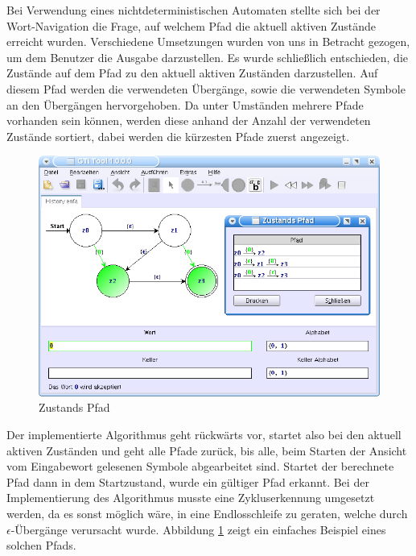 Bei Verwendung eines nichtdeterministischen Automaten stellte sich bei der
Wort-Navigation die Frage, auf welchem Pfad die aktuell aktiven Zustände erreicht
wurden. Verschiedene Umsetzungen wurden von uns in Betracht gezogen, um dem
Benutzer die Ausgabe darzustellen. Es wurde schließlich entschieden, die Zustände
auf dem Pfad zu den aktuell aktiven Zuständen darzustellen. Auf diesem Pfad
werden die verwendeten Übergänge, sowie die verwendeten Symbole an den Übergängen
hervorgehoben. Da unter Umständen mehrere Pfade vorhanden sein können, werden
diese anhand der Anzahl der verwendeten Zustände sortiert, dabei werden die
kürzesten Pfade zuerst angezeigt.\vspace{10pt}

\begin{figure}[h!]
\begin{center}
\includegraphics[width=12cm]{../images/history_path.png}
\caption{Zustands Pfad}
\label{FigureHistoryPath}
\end{center}
\end{figure}
\vspace{10pt}

Der implementierte Algorithmus geht rückwärts vor, startet also bei den aktuell
aktiven Zuständen und geht alle Pfade zurück, bis alle, beim Starten der Ansicht
vom Eingabewort gelesenen Symbole abgearbeitet sind. Startet der berechnete Pfad
dann in dem Startzustand, wurde ein gültiger Pfad erkannt. Bei der
Implementierung des Algorithmus musste eine Zykluserkennung umgesetzt werden, da
es sonst möglich wäre, in eine Endlosschleife zu geraten, welche durch
$\epsilon$-Übergänge verursacht wurde. Abbildung \ref{FigureHistoryPath} zeigt
ein einfaches Beispiel eines solchen Pfads.\vspace{10pt}


